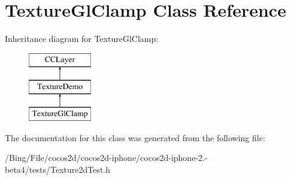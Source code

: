 \hypertarget{interface_texture_gl_clamp}{\section{Texture\-Gl\-Clamp Class Reference}
\label{interface_texture_gl_clamp}
}
Inheritance diagram for Texture\-Gl\-Clamp\-:\begin{figure}[H]
\begin{center}
\leavevmode
\includegraphics[height=3.000000cm]{interface_texture_gl_clamp}
\end{center}
\end{figure}


The documentation for this class was generated from the following file\-:\begin{DoxyCompactItemize}
\item 
/\-Bing/\-File/cocos2d/cocos2d-\/iphone/cocos2d-\/iphone-\/2.-\/beta4/tests/Texture2d\-Test.\-h\end{DoxyCompactItemize}
